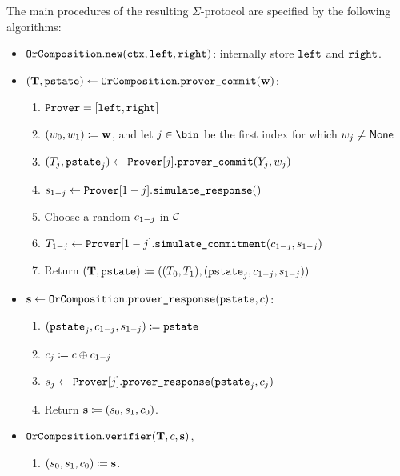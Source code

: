 \documentclass[11pt]{article}
\begin{document}
The main procedures of the resulting $\Sigma$-protocol are specified by the following algorithms:
\begin{itemize}
  \item
  $\texttt{OrComposition}.\texttt{new}(\texttt{ctx}, \texttt{left}, \texttt{right})$: internally store $\texttt{left}$ and $\texttt{right}$.
  \item
  $(\mathbf {T}, \texttt{pstate})\gets \texttt{OrComposition}.\texttt{prover\_commit}(\mathbf {w})$:
    \begin{enumerate}
      \item $\texttt{Prover} = [\texttt{left}, \texttt{right}]$
      \item
        $(w_0,w_1)\coloneqq \mathbf {w}$, and let $j \in \bin$ be the first index for which $w_{j}\neq\mathsf{None}$
      \item
        $(T_j,\texttt{pstate}_j)\gets\texttt{Prover}[j].\texttt{prover\_commit}(Y_j,w_j)$
      \item
			   $s_{1-j}\gets\texttt{Prover}[1-j].\texttt{simulate\_response}()$
			\item
        Choose a random $c_{1-j}$ in $\mathcal{C}$
      \item
        $T_{1-j}\gets\texttt{Prover}[1-j].\texttt{simulate\_commitment}(c_{1-j},s_{1-j})$
      \item
	Return $(\mathbf {T},\texttt{pstate}) \coloneqq ((T_0,T_1),(\texttt{pstate}_j,c_{1-j},s_{1-j}))$
    \end{enumerate}
  \item
  $\mathbf {s} \gets \texttt{OrComposition}.\texttt{prover\_response}(\texttt{pstate}, c)$:
    \begin{enumerate}
      \item  $(\texttt{pstate}_j,c_{1-j},s_{1-j})\coloneqq\texttt{pstate}$
      \item
         $c_j\coloneqq c\oplus c_{1-j}$
         \item $s_j\gets\texttt{Prover}[j].\texttt{prover\_response}(\texttt{pstate}_j, c_j)$
      \item
        Return $\mathbf {s}\coloneqq(s_0,s_1, c_0)$.
    \end{enumerate}
  \item
  $\texttt{OrComposition}.\texttt{verifier}(\mathbf {T}, c, \mathbf {s})$,
    \begin{enumerate}
      \item
         $(s_0, s_1, c_0)\coloneqq \mathbf {s}$.

\end{enumerate}
\end{itemize}
\end{document}
